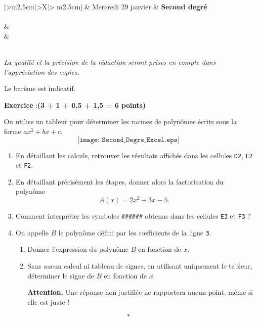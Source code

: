 \documentclass[12pt,french]{article}
\newcounter{exoc}
\newenvironment{exoc}[1]{%
  \refstepcounter{exoc}\textbf{Exercice \theexoc} :\hfill {\textbf{(#1)}}\par
  \medskip}%
{\medskip}
\begin{document}
\pieddepage{}{}{}

\begin{center}
\begin{tabularx}{\textwidth}{|>\centering m{2.5cm}|>\centering X|>{\centering\arraybackslash} m{2.5cm}|}
	\iere {} &  Mercredi 29 janvier  & \textbf{Second degré} \\
	\hline
		 \\
	\hline
         &  \\
		 &  \\
	\hline
         \\[1cm]
    \hline
\end{tabularx}\bigskip

{\itshape
La qualité et la précision de la rédaction seront prises en compte dans l'appréciation des copies.\par
Le barème est indicatif.
}
\end{center}

\begin{exoc}{3 + 1 + 0,5 + 1,5 = 6 points}
    On utilise un tableur pour déterminer les racines de polynômes écrits sous la forme $ax^2 + bx+c$.
    \[\texttt{[image: Second\_Degre\_Excel.eps]}\]
    \begin{enumerate}
        \item En détaillant les calculs, retrouver les résultats affichés dans les cellules \verb!D2!, \verb!E2! et \verb!F2!.
        \item En détaillant précisément les étapes, donner alors la factorisation du polynôme \[A(x) = 2x^2 + 3x - 5.\]
        \item Comment interpréter les symboles \verb!######! obtenus dans les cellules \verb!E3! et \verb!F3! ?
        \item On appelle $B$ le polynôme défini par les c{\oe}fficients de la ligne \verb!3!.
            \begin{enumerate}
                \item Donner l'expression du polynôme $B$ en fonction de $x$.
                \item Sans aucun calcul ni tableau de signes, en utilisant uniquement le tableur, déterminer le signe de $B$ en fonction de $x$.\par \textbf{Attention.} Une réponse non justifiée ne rapportera aucun point, même si elle est juste !
            \end{enumerate}
    \end{enumerate}
\end{exoc}\[*\]
\end{document}
